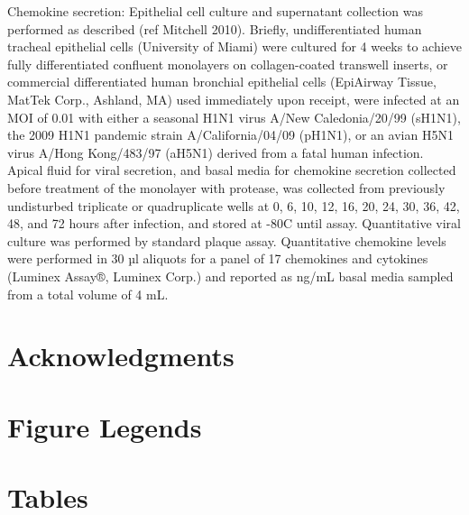 \documentclass[10pt]{article}
\begin{document}
Chemokine secretion:  Epithelial cell culture and supernatant collection was performed as described (ref Mitchell 2010).  Briefly, undifferentiated human tracheal epithelial cells (University of Miami) were cultured for 4 weeks to achieve fully differentiated confluent monolayers on collagen-coated transwell inserts, or commercial differentiated human bronchial epithelial cells (EpiAirway Tissue, MatTek Corp., Ashland, MA) used immediately upon receipt, were infected at an MOI of 0.01 with either a seasonal H1N1 virus A/New Caledonia/20/99 (sH1N1), the 2009 H1N1 pandemic strain A/California/04/09 (pH1N1), or an avian H5N1 virus A/Hong Kong/483/97 (aH5N1) derived from a fatal human infection.  Apical fluid for viral secretion, and basal media for chemokine secretion collected before treatment of the monolayer with protease, was collected from previously undisturbed triplicate or quadruplicate wells at 0, 6, 10, 12, 16, 20, 24, 30, 36, 42, 48, and 72 hours after infection, and stored at -80C until assay.  Quantitative viral culture was performed by standard plaque assay.  Quantitative chemokine levels were performed in 30 µl aliquots for a panel of 17 chemokines and cytokines (Luminex Assay®, Luminex Corp.) and reported as ng/mL basal media sampled from a total volume of 4 mL.

\section*{Acknowledgments}




\section*{Figure Legends}


\section*{Tables}
\end{document}
